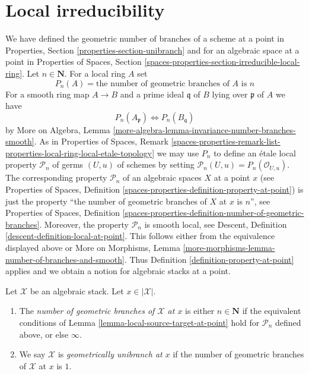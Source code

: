 \section{Local irreducibility}
\label{section-irreducible-local-ring}

\noindent
We have defined the geometric number of branches of a scheme at a point
in Properties, Section \ref{properties-section-unibranch}
and for an algebraic space at a point in Properties of Spaces, Section
\ref{spaces-properties-section-irreducible-local-ring}.
Let $n \in \mathbf{N}$. For a local ring $A$ set
$$
P_n(A) = \text{the number of geometric branches of }A\text{ is }n
$$
For a smooth ring map $A \to B$ and a prime ideal $\mathfrak q$
of $B$ lying over $\mathfrak p$ of $A$ we have
$$
P_n(A_\mathfrak p) \Leftrightarrow P_n(B_\mathfrak q)
$$
by More on Algebra, Lemma
\ref{more-algebra-lemma-invariance-number-branches-smooth}.
As in Properties of Spaces, Remark
\ref{spaces-properties-remark-list-properties-local-ring-local-etale-topology}
we may use $P_n$ to define an \'etale local property $\mathcal{P}_n$
of germs $(U, u)$ of schemes by setting
$\mathcal{P}_n(U, u) = P_n(\mathcal{O}_{U, u})$.
The corresponding property $\mathcal{P}_n$
of an algebraic spaces $X$ at a point $x$
(see Properties of Spaces, Definition
\ref{spaces-properties-definition-property-at-point})
is just the property
``the number of geometric branches of $X$ at $x$ is $n$'', see
Properties of Spaces, Definition
\ref{spaces-properties-definition-number-of-geometric-branches}.
Moreover, the property $\mathcal{P}_n$ is smooth local, see
Descent, Definition \ref{descent-definition-local-at-point}.
This follows either from the equivalence displayed above
or More on Morphisms, Lemma
\ref{more-morphisms-lemma-number-of-branches-and-smooth}.
Thus Definition \ref{definition-property-at-point}
applies and we obtain a notion for algebraic stacks at a point.

\begin{definition}
\label{definition-number-of-geometric-branches}
Let $\mathcal{X}$ be an algebraic stack. Let $x \in |\mathcal{X}|$.
\begin{enumerate}
\item The {\it number of geometric branches of $\mathcal{X}$ at $x$}
is either $n \in \mathbf{N}$ if the equivalent conditions of
Lemma \ref{lemma-local-source-target-at-point} hold for
$\mathcal{P}_n$ defined above, or else $\infty$.
\item We say $\mathcal{X}$ is {\it geometrically unibranch at $x$}
if the number of geometric branches of $\mathcal{X}$ at $x$ is $1$.
\end{enumerate}
\end{definition}






